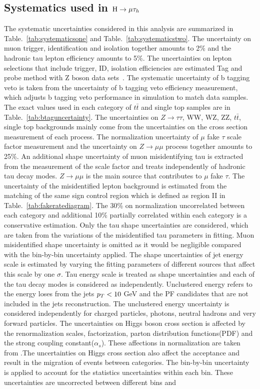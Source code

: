 \subsection{Systematics used in $\mathrm{H}\to \mu\tau_{h}$}
The systematic uncertainties considered in this analysis are summarized in Table.~\ref{tab:systematicsone} and Table.~\ref{tab:systematicstwo}. The uncertainty on muon trigger, identification and isolation together amounts  to 2\% and the hadronic tau lepton efficiency amounts to 5\%. The uncertainties on lepton selections that include trigger, ID, isolation efficiencies are estimated Tag and probe method with Z boson data sets~\cite{Khachatryan2011,Chatrchyan:2012xi,Khachatryan:2015hwa,Khachatryan:2015dfa,CMS:2016gvn}. The systematic uncertainty of b tagging veto is taken from the uncertainty of b tagging veto efficiency measurement, which adjusts b tagging veto performance in simulation to match data samples. The exact values used in each category of $t\bar{t}$ and single top samples are in Table.~\ref{tab:btaguncertainty}. The uncertainties on $Z\to\tau\tau$, WW, WZ, ZZ, $t\bar{t}$, single top backgrounds mainly come from the uncertainties on the cross section measurement of each process. The normalization uncertainty of $\mu$ fake $\tau$ scale factor measurement and the uncertainty on $Z\to \mu\mu$ process together amounts to 25\%. An additional shape uncertainty of muon misidentifying tau is extracted from the measurement of the scale factor and treats independently of hadronic tau decay modes. $Z\to \mu\mu$ is the main source that contributes to $\mu$ fake $\tau$.  The uncertainty of the misidentified lepton background is estimated from the matching of the same sign control region which is defined as region II in Table.~\ref{tab:fakeratediagram}. The 30\% on normalization uncorrelated between each category and additional 10\% partially correlated within each category is a conservative estimation. Only the tau shape uncertainties are considered, which are taken from the variations of the misidentified tau parameters in fitting.  Muon misidentified shape uncertainty is omitted as it would be negligible compared with the bin-by-bin uncertainty applied.  The shape uncertainties of jet energy scale is estimated by varying the fitting parameters of different sources that affect this scale by one $\sigma$. Tau energy scale is treated as shape uncertainties and each of the tau decay modes is considered as independently. Unclustered energy refers to the energy loses from the jets $p_{T}<10$ GeV and the PF candidates that are not included in the jets reconstruction. The unclustered energy uncertainty is considered independently for charged particles, photons, neutral hadrons and very forward particles.  The uncertainties on Higgs boson cross section is affected by the renormalization scales, factorization, parton distribution functions(PDF) and the strong coupling constant($\alpha_{s}$). These affections in normalization are taken from \cite{YR4}.The uncertainties on Higgs cross section also affect the acceptance and result in the migration of events between categories.  The bin-by-bin uncertainty is applied to account for the statistics uncertainties within each bin. These uncertainties are uncorrected between different bins and 